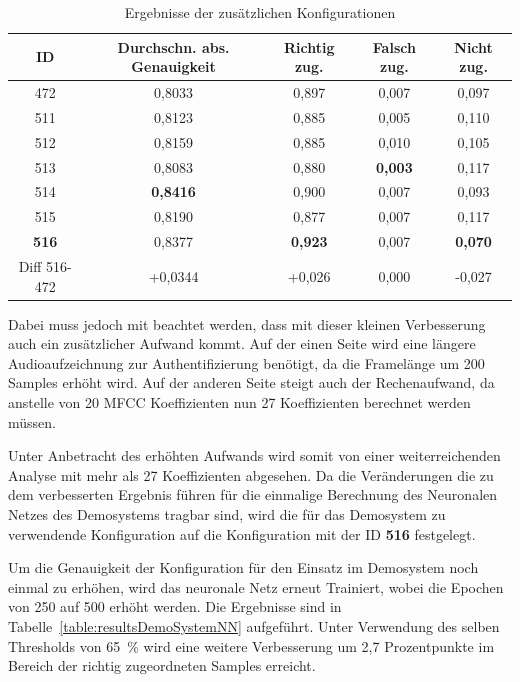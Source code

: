 \begin{table}[H]
    \centering
    \begin{tabular}{c|c|c|c|c}
        ID            & Durchschn. abs. Genauigkeit & Richtig zug.   & Falsch zug.    & Nicht zug.     \\ \hline
        472           & 0,8033                      & 0,897          & 0,007          & 0,097          \\ \hline \hline
        511           & 0,8123                      & 0,885          & 0,005          & 0,110          \\ \hline
        512           & 0,8159                      & 0,885          & 0,010          & 0,105          \\ \hline
        513           & 0,8083                      & 0,880          & \textbf{0,003} & 0,117          \\ \hline
        514           & \textbf{0,8416}             & 0,900          & 0,007          & 0,093          \\ \hline
        515           & 0,8190                      & 0,877          & 0,007          & 0,117          \\ \hline
        \textbf{516}  & 0,8377                      & \textbf{0,923} & 0,007          & \textbf{0,070} \\ \hline \hline
        Diff 516-472  & +0,0344                     & +0,026         & 0,000          & -0,027
    \end{tabular}
    \caption{Ergebnisse der zusätzlichen Konfigurationen}
    \label{table:resultAdditionalKonfigs}
\end{table}
Dabei muss jedoch mit beachtet werden, dass mit dieser kleinen Verbesserung auch ein zusätzlicher Aufwand kommt.
Auf der einen Seite wird eine längere Audioaufzeichnung zur Authentifizierung benötigt, da die Framelänge um 200 Samples erhöht wird.
Auf der anderen Seite steigt auch der Rechenaufwand, da anstelle von 20 \ac{MFCC} Koeffizienten nun 27 Koeffizienten berechnet werden müssen.

Unter Anbetracht des erhöhten Aufwands wird somit von einer weiterreichenden Analyse mit mehr als 27 Koeffizienten abgesehen.
Da die Veränderungen die zu dem verbesserten Ergebnis führen für die einmalige Berechnung des Neuronalen Netzes des Demosystems tragbar sind, wird die für das Demosystem zu verwendende Konfiguration auf die Konfiguration mit der ID \textbf{516} festgelegt.

Um die Genauigkeit der Konfiguration für den Einsatz im Demosystem noch einmal zu erhöhen, wird das neuronale Netz erneut Trainiert, wobei die Epochen von 250 auf 500 erhöht werden.
Die Ergebnisse sind in Tabelle~\ref{table:resultsDemoSystemNN} aufgeführt.
Unter Verwendung des selben Thresholds von 65~\% wird eine weitere Verbesserung um 2,7 Prozentpunkte im Bereich der richtig zugeordneten Samples erreicht.


